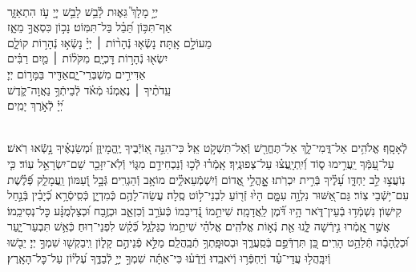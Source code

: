 \documentclass[twoside, openany, parskip=half, 11pt]{book}
\begin{document}
\\
\vspace{-1.5\baselineskip}
\begin{narrow}
יְיָ֣ מָלָךְ֮ גֵּא֢וּת לָ֫בֵ֥שׁ\hfill
לָבֵ֣שׁ יְיָ֭ עֹ֣ז הִתְאַזָּ֑ר\\ אַף־תִּכּ֥וֹן תֵּ֝בֵ֗ל בַּל־תִּמּֽוֹט׃ \hfill
נָכ֣וֹן כִּסְאֲךָ֣ מֵאָ֑ז\\ מֵעוֹלָ֣ם אָֽתָּה׃ \hfill
נָשְֿׂא֤וּ נְֿהָר֨וֹת ׀ יְיָ֗ נָשְֿׂא֣וּ נְֿהָר֣וֹת קוֹלָ֑ם\\ יִשְׂא֖וּ נְֿהָר֣וֹת דׇּכְיָֽם׃ \hfill
מִקֹּל֨וֹת ׀ מַ֤יִם רַבִּ֗ים\\ אַדִּירִ֣ים מִשְׁבְּרֵי־יָ֑ם\hfill אַדִּ֖יר בַּמָּר֣וֹם יְיָ׃ \\
עֵֽדֹתֶ֨יךָ ׀ נֶאֶמְנ֬וּ מְֿאֹ֗ד \hfill לְֿבֵיתְֿךָ֥ נַאֲוָה־קֹ֑דֶשׁ\\ יְ֝יָ֗ לְֿאֹ֣רֶךְ יָמִֽים׃ \hfill \break
\end{narrow}




\label{kaddish_yasom_shacharis}


\mournerskaddish


\\
%
לְֿאָסָֽף׃ אֱלֹהִ֥ים אַל־דֳּמִי־לָ֑ךְ אַל־תֶּחֱרַ֖שׁ וְֿאַל־תִּשְׁקֹ֣ט אֵֽל׃ כִּי־הִנֵּ֣ה אֽ֭וֹיְֿבֶיךָ יֶֽהֱמָיוּ֑ן וּ֝מְשַׂנְאֶ֗יךָ נָ֣שְֿׂאוּ רֹֽאשׁ׃ עַל־עַ֭מְּֿךָ יַֽעֲרִ֣ימוּ ס֑וֹד וְֿ֝יִֽתְיָֽעֲצ֗וּ עַל־צְפוּנֶֽיךָ׃
אָֽמְֿר֗וּ לְֿכ֣וּ וְֿנַכְחִידֵ֣ם מִגּ֑וֹי וְֿלֹֽא־יִזָּכֵ֖ר שֵׁם־יִשְׂרָאֵ֣ל עֽוֹד׃ כִּ֤י נֽוֹעֲצ֣וּ לֵ֣ב יַחְדָּ֑ו עָ֝לֶ֗יךָ בְּֿרִ֣ית יִכְרֹֽתוּ׃ אׇׇׇׇׇׇָֽהֳלֵ֣י אֱ֭דוֹם וְֿיִשְׁמְֿעֵאלִ֑֗ים מוֹאָ֥ב וְֿהַגְרִֽים׃ גְּֿבָ֣ל וְֿ֭עַמּוֹן וַֽעֲמָלֵ֑ק פְּֿ֝לֶ֗שֶׁת עִם־י֥שְֿׁבֵי צֽוֹר׃ גַּם־אַ֭שּׁוּר נִלְוָ֣ה עִמָּ֑ם הָי֙וּ זְֿר֖וֹעַ לִבְנֵי־ל֣וֹט סֶֽלָה׃ עֲשֵׂה־לָהֶ֥ם כְּֿמִדְיָ֑ן כְּֿסִֽיסְֿרָ֥א כְֿ֝יָבִ֗ין בְּֿנַ֣חַל קִישֽׁוֹן׃ נִשְׁמְֿד֥וּ בְֿעֵין־דֹּ֑אר הָ֥יוּ דֹּ֝֗מֶן לַֽאֲדָמָֽה׃ שִׁיתֵ֣מוֹ נְֿ֭דִיבֵמוֹ כְּֿעֹרֵ֣ב וְֿכִזְאֵ֑ב וּכְזֶ֥בַח וּ֝כְצַלְמֻנָּ֗ע כׇּל־נְסִיכֵֽמוֹ׃ אֲשֶׁ֣ר אָֽ֭מְֿרוּ נִ֣ירְֿשָׁה לָּ֑נוּ אֵ֖ת נְֿא֣וֹת אֱלֹהִֽים׃ אֱלֹהַ֗י שִׁיתֵ֥מוֹ כַגַּלְגַּ֑ל כְּֿ֝קַ֗שׁ לִפְנֵי־רֽוּחַ׃ כְּֿאֵ֥שׁ תִּבְעַר־יָ֑עַר וּ֝כְלֶֽהָבָ֗ה תְּֿלַהֵ֥ט הָרִֽים׃ כֵּ֭ן תִּרְדְּֿפֵ֣ם בְּֿסַֽעֲרֶ֑ךָ וּבְסוּפָֽתְךָ֥ תְֿבַֽהֲלֵֽם׃ מַלֵּ֣א פְֿנֵיהֶ֣ם קָל֑וֹן וִֽיבַקְשׁ֖וּ שִׁמְךָ֣ יְיָ׃ יֵבֹ֖שׁוּ וְֿיִבָּֽהֲל֥וּ עֲדֵי־עַ֗ד וְֿיַחְפְּֿר֥וּ וְֿיֹאבֵֽדוּ׃ וְֿיֵֽדְֿע֗וּ כִּי־אַתָּ֬ה שִׁמְךָ֣ יְיָ֣ לְֿבַדֶּ֑ךָ עֶ֝לְי֗וֹן עַל־כׇּל־הָאָֽרֶץ׃

\nextpage
\end{document}
